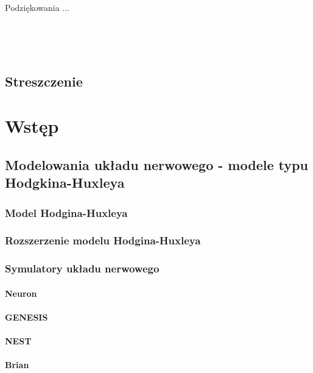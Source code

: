 \documentclass[a4paper,12pt,polish]{book}
\begin{document}
\newpage
\thispagestyle{empty}
\ 
\newpage
\thispagestyle{empty}
\vspace*{0.5\textheight}

\hspace*{0.5\textwidth} \begin{minipage}[c]{0.5\textwidth}
  {\sc Podziękowania ...}
\end{minipage}

\ 
\newpage


\ 
\newpage





\section*{Streszczenie} 

\tableofcontents
\chapter{Wstęp}
\section{Modelowania układu nerwowego - modele typu Hodgkina-Huxleya}
\subsection{Model Hodgina-Huxleya}
\subsection{Rozszerzenie modelu Hodgina-Huxleya}
\subsection{Symulatory układu nerwowego}
\subsubsection{Neuron}
\subsubsection{GENESIS}
\subsubsection{NEST}
\subsubsection{Brian}
\end{document}
